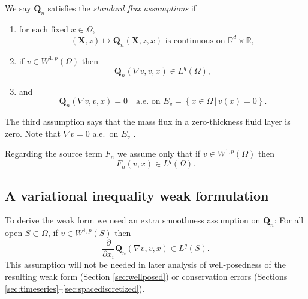 \documentclass[final,onefignum]{siamart190516}
\newcommand\bQ{\mathbf{Q}}
\newcommand\bX{\mathbf{X}}
\newcommand{\grad}{\nabla}
\newcommand\RR{\mathbb{R}}
\begin{document}
\begin{definition}  \label{ass:std}  We say $\bQ_n$ satisfies the \emph{standard flux assumptions} if
\renewcommand{\labelenumi}{\emph{\roman{enumi}})}
\begin{enumerate}
\item for each fixed $x\in \Omega$,
\begin{equation}
(\bX,z) \mapsto \bQ_n(\bX,z,x) \text{ is continuous on } \RR^d \times \RR,  \label{eq:Qiscontinuous}
\end{equation}
\item if $v \in W^{1,p}(\Omega)$ then
\begin{equation}
\bQ_n(\grad v,v,x) \in L^q(\Omega), \label{eq:QisLq}
\end{equation}
\item and
\begin{equation}
\bQ_n(\grad v,v,x)=0 \quad \text{a.e.~on } E_v = \left\{x\in\Omega\,\big|\,v(x)=0\right\}. \label{eq:Qiszero}
\end{equation}
\end{enumerate}
\end{definition}
The third assumption says that the mass flux in a zero-thickness fluid layer is zero.  Note that $\grad v = 0$ a.e.~on $E_v$ \cite[lemma A.4 in chapter II]{KinderlehrerStampacchia1980}.

Regarding the source term $F_n$ we assume only that if $v\in W^{1,p}(\Omega)$ then
\begin{equation}
F_n(v,x) \in L^q(\Omega).  \label{eq:FisLq}
\end{equation}

\subsection{A variational inequality weak formulation}  \label{subsec:derivevi}  To derive the weak form we need an extra smoothness assumption on $\bQ_n$:  For all open $S \subset \Omega$, if $v\in W^{1,p}(S)$ then
\begin{equation}
\frac{\partial}{\partial x_i} \bQ_n(\grad v,v,x) \in L^q(S). \label{eq:Qissmooth}
\end{equation}
This assumption will not be needed in later analysis of well-posedness of the resulting weak form (Section \ref{sec:wellposed}) or conservation errors (Sections \ref{sec:timeseries}--\ref{sec:spacediscretized}).
\end{document}

